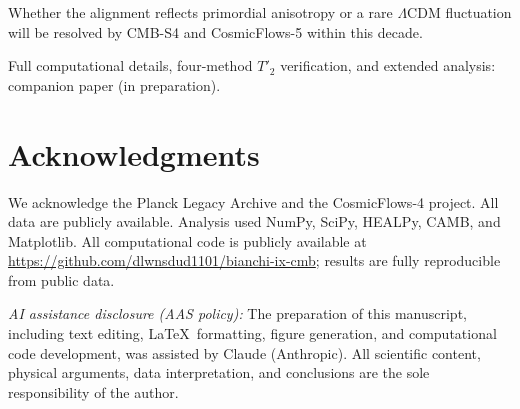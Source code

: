 \documentclass[12pt]{article}
\begin{document}
Whether the alignment reflects primordial anisotropy or a rare $\Lambda$CDM
fluctuation will be resolved by CMB-S4 and CosmicFlows-5 within this decade.

Full computational details, four-method $T'_2$ verification, and extended analysis:
companion paper (in preparation).

\section*{Acknowledgments}

We acknowledge the Planck Legacy Archive and the CosmicFlows-4 project.
All data are publicly available. Analysis used NumPy, SciPy, HEALPy, CAMB, and
Matplotlib. All computational code is publicly available at
\url{https://github.com/dlwnsdud1101/bianchi-ix-cmb}; results are fully
reproducible from public data.

\noindent\textit{AI assistance disclosure (AAS policy):} The preparation of this
manuscript, including text editing, \LaTeX\ formatting, figure generation, and
computational code development, was assisted by Claude (Anthropic). All scientific
content, physical arguments, data interpretation, and conclusions are the sole
responsibility of the author.
\end{document}
